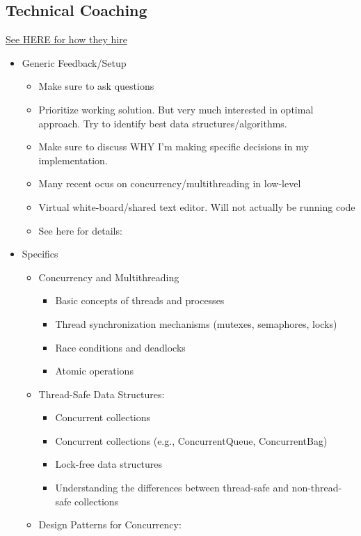 \documentclass{article}
\begin{document}
\subsection{Technical Coaching}
\href{https://amazon.jobs/content/en/how-we-hire/sde-ii-interview-prep}{See HERE for how they hire}
\begin{itemize}
	\item Generic Feedback/Setup
	\begin{itemize}
		\item Make sure to ask questions
		\item Prioritize working solution. But very much interested in optimal approach. Try to identify best data structures/algorithms.
		\item Make sure to discuss WHY I'm making specific decisions in my implementation.
		\item Many recent ocus on concurrency/multithreading in low-level
		\item Virtual white-board/shared text editor. Will not actually be running code
		\item See here for details: 
	\end{itemize}
	\item Specifics
		\begin{itemize}
			\item Concurrency and Multithreading
				\begin{itemize}
					\item Basic concepts of threads and processes
					\item Thread synchronization mechanisms (mutexes, semaphores, locks)
					\item Race conditions and deadlocks
					\item Atomic operations
				\end{itemize}
			\item Thread-Safe Data Structures:
				\begin{itemize}
					\item Concurrent collections
					\item Concurrent collections (e.g., ConcurrentQueue, ConcurrentBag)
					\item Lock-free data structures
					\item Understanding the differences between thread-safe and non-thread-safe collections
				\end{itemize}
			\item Design Patterns for Concurrency:
				\begin{itemize}

\end{itemize}
\end{itemize}
\end{itemize}
\end{document}
